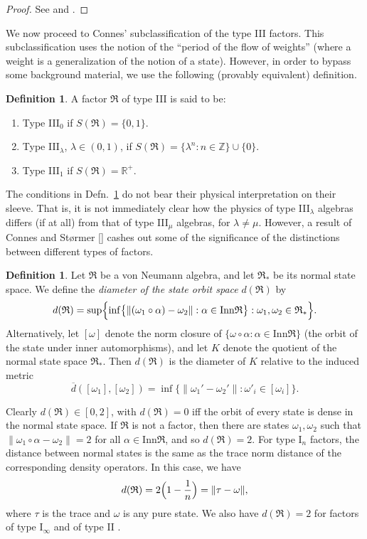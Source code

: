 \documentclass[12pt]{article}
\newcommand{\norm}[1]{\| #1\|}
\theoremstyle{definition}
\theoremstyle{definition}
\newtheorem{defn}[thm]{Definition}
\theoremstyle{remark}
\def\7#1{{\mathbb #1}}
\def\ol#1{{\overline #1}}
\def\al#1{{\mathfrak #1}}
\def\a{\alpha} \def\b{\beta} \def\g{\gamma} \def\d{\delta}
\def\om{\omega} \def\Om{\Omega} \def\dd{\partial} \def\D{\Delta}
\newcommand{\Inn}{\mathrm{Inn}}
\begin{document}
\begin{proof} See \cite[p.\ 122]{tak2} and \cite[p.\ 111]{sunder}.
\end{proof}

We now proceed to Connes' subclassification of the type III factors.
This subclassification uses the notion of the ``period of the flow of
weights'' (where a weight is a generalization of the notion of a
state).  However, in order to bypass some background material, we use
the following (provably equivalent) definition.

  \begin{defn} A factor $\al R$ of type III is said to be:
\begin{enumerate}
\item Type III$_0$ if $S(\al R)=\{ 0,1\}$.
\item Type III$_\lambda$, $\lambda \in (0,1)$, if $S(\al R) = \{
  \lambda ^n :n\in \7Z \} \cup \{ 0\}$.
\item Type III$_1$ if $S(\al R)=\7R ^+$.
\end{enumerate} \label{connes}
\end{defn} 

The conditions in Defn.\ \ref{connes} do not bear their physical
interpretation on their sleeve.  That is, it is not immediately clear
how the physics of type III$_{\lambda}$ algebras differs (if at all)
from that of type III$_\mu$ algebras, for $\lambda \neq \mu$.
However, a result of Connes and St{\o}rmer [\citeyear{consto}] cashes
out some of the significance of the distinctions between different
types of factors.

\begin{defn} Let $\al R$ be a von Neumann algebra, and let $\al R_*$
  be its normal state space.  We define the \emph{diameter of the
    state orbit space} $d(\al R)$ by 
$$ d (\al R) = \sup \Bigl\{ \inf \bigl\{ \norm{ (\om _1\circ \a )-\om _2 } :
\a \in \Inn \al R \bigr\} : \om _1,\om _2 \in \al R_{*}
\Bigr\} .$$ Alternatively, let $[\om ]$ denote the norm
closure of $\{ \om \circ \a :\a \in \Inn \al R\}$ (the
orbit of the state under inner automorphisms), and let
$K$ denote the quotient of the normal state space $\al
R_*$.  Then $d(\al R)$ is the diameter of $K$ relative
to the induced metric
\[ \ol d([\om _1],[\om _2]) = \inf \{ \norm{\om _1'-\om _2'} :\om '_i\in
[\om _i] \} .\] 
\end{defn}

Clearly $d(\al R )\in [0,2]$, with $d(\al R)=0$ iff the
orbit of every state is dense in the normal state
space.  If $\al R$ is not a factor, then there are
states $\om _1,\om _2$ such that $\norm{\om _1\circ \a
  -\om _2}=2$ for all $\a \in \Inn \al R$, and so
$d(\al R)=2$.  For type I$_n$ factors, the distance
between normal states is the same as the trace norm
distance of the corresponding density operators.  In
this case, we have
$$d(\al R)= 2\Bigl( 1-\frac{1}{n} \Bigr) =\norm{\tau -\om },$$
where $\tau$ is the trace and $\om$ is any pure state.  We also have
$d(\al R)=2$ for factors of type I$_\infty$ and of type II \cite[p.\
430]{tak2}.
\end{document}
